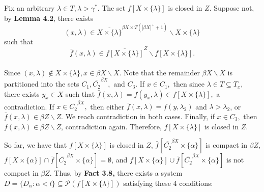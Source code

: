 \documentclass{article}
\begin{document}
\vskip 15pt
Fix an arbitrary $\lambda \in T, \lambda >\gamma^*.$
\vskip 10pt
The set $f\left[X\times \{\lambda\}\right]$ is closed in $Z$. Suppose not, by \textbf{Lemma 4.2}, there exists 
$$(x,\lambda)\in \overline{X\times \{\lambda\}}^{\beta X\times T(|\beta X|^+ +1)} \backslash X\times \{\lambda\}$$ such that $$\bar{f}(x,\lambda) \in \overline{f\left[X\times\{\lambda\}\right]}^Z \backslash f\left[X\times \{\lambda\}\right].$$ 
\\
Since $(x,\lambda)\notin X\times \{\lambda\}, x\in \beta X\backslash X.$ Note that the remainder $\beta X\backslash X$ is partitioned into the sets $C_1, \overline{C_2}^{\beta X},$ and $C_3$. If $x\in C_1,$ then since $\lambda \in T\subseteq T_x$, there exists $y_x\in X$ such that $\bar{f}(x,\lambda)= f(y_x,\lambda) \in f\left[X\times\{\lambda\}\right],$ a contradiction. If $x\in \overline{C_2}^{\beta X},$ then either $\bar{f}(x,\lambda)=f(y,\lambda_2)$ and $\lambda>\lambda_2$, or $\bar{f}(x,\lambda)\in \beta Z\backslash Z$. We reach contradiction in both cases. Finally, if $x\in C_3,$ then $\bar{f}(x,\lambda)\in \beta Z\backslash Z$, contradiction again. Therefore, $f\left[X\times\{\lambda\}\right]$ is closed in $Z$.


\vskip 20pt

So far, we have that $f\left[X\times\{\lambda\}\right]$ is closed in $Z$, $\bar{f}\left[\overline{C_2}^{\beta X} \times \{\alpha\}\right]$ is compact in $\beta Z$, $f\left[X\times \{\alpha\}\right]\cap \bar{f}\left[\overline{C_2}^{\beta X} \times \{\alpha\}\right] = \emptyset$, and $f\left[X\times \{\alpha\}\right]\cup \bar{f}\left[\overline{C_2}^{\beta X} \times \{\alpha\}\right]$ is not compact in $\beta Z$. Thus, by \textbf{Fact 3.8,} there exists a system $D=\{D_\alpha:\alpha<l\}\subseteq \mathcal{P}\left(f\left[X\times\{\lambda\}\right]\right)$ satisfying these 4 conditions:
\end{document}
